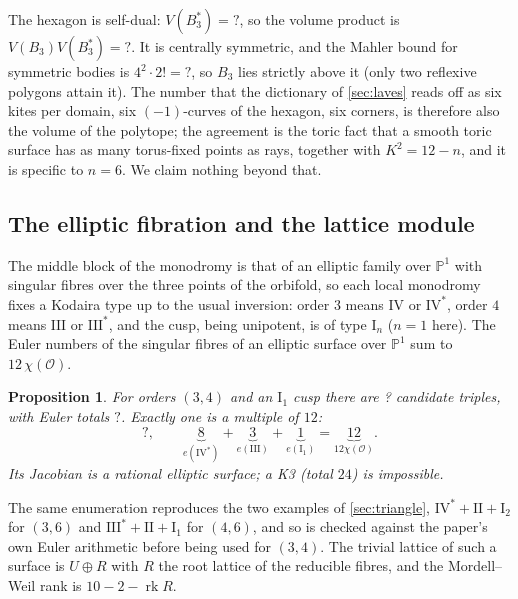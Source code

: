 \documentclass[11pt,a4paper]{article}
\newcommand{\SSDPDual}{?}\newcommand{\SSDPProduct}{?}
\newcommand{\SSDPBoundSym}{?}\newcommand{\SSDPKTwo}{?}
\newcommand{\SSKodairaCandidates}{?}\newcommand{\SSKodairaTotals}{?}
\newcommand{\SSKodairaTriple}{?}
\theoremstyle{plain}
\newtheorem{proposition}{Proposition}
\theoremstyle{definition}
\begin{document}
The hexagon is self-dual: $V(B_3^*) = \SSDPDual$, so the volume product is
$V(B_3)V(B_3^*) = \SSDPProduct$. It is centrally symmetric, and the Mahler
bound for symmetric bodies is $4^2\cdot 2! = \SSDPBoundSym$, so $B_3$ lies
strictly above it (only two reflexive polygons attain it). The number that
the dictionary of \cref{sec:laves} reads off as six kites per domain, six
$(-1)$-curves of the hexagon, six corners, is therefore also the volume of
the polytope; the agreement is the toric fact that a smooth toric surface has
as many torus-fixed points as rays, together with $K^2 = 12 - n$, and it is
specific to $n = 6$. We claim nothing beyond that.

\subsection{The elliptic fibration and the lattice module}
\label{sec:links-lattice}

The middle block of the monodromy is that of an elliptic family over
$\mathbb{P}^1$ with singular fibres over the three points of the orbifold,
so each local monodromy fixes a Kodaira type up to the usual inversion: order
$3$ means $\mathrm{IV}$ or $\mathrm{IV}^*$, order $4$ means $\mathrm{III}$ or
$\mathrm{III}^*$, and the cusp, being unipotent, is of type
$\mathrm{I}_n$ ($n = 1$ here). The Euler numbers of the singular fibres of an elliptic
surface over $\mathbb{P}^1$ sum to $12\,\chi(\mathcal{O})$.

\begin{proposition}
\label{prop:kodaira}
For orders $(3,4)$ and an $\mathrm{I}_1$ cusp there are \SSKodairaCandidates{}
candidate triples, with Euler totals $\SSKodairaTotals$. Exactly one is a
multiple of $12$:
\[
  \SSKodairaTriple, \qquad
  \underbrace{8}_{e(\mathrm{IV}^*)} + \underbrace{3}_{e(\mathrm{III})}
  + \underbrace{1}_{e(\mathrm{I}_1)} = \underbrace{12}_{12\chi(\mathcal O)} .
\]
Its Jacobian is a rational elliptic surface; a K3 (total $24$) is impossible.
\end{proposition}

The same enumeration reproduces the two examples of \cref{sec:triangle},
$\mathrm{IV}^*+\mathrm{II}+\mathrm{I}_2$ for $(3,6)$ and
$\mathrm{III}^*+\mathrm{II}+\mathrm{I}_1$ for $(4,6)$, and so is checked
against the paper's own Euler arithmetic before being used for $(3,4)$. The
trivial lattice of such a surface is $U \oplus R$ with $R$ the root lattice
of the reducible fibres, and the Mordell--Weil rank is
$10 - 2 - \operatorname{rk}R$.
\end{document}
